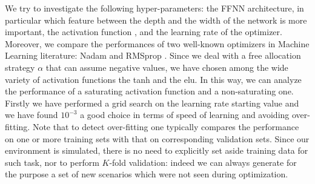 \documentclass[runningheads]{m2ef}
\newcommand{\change}[1]{{\color{red} {#1}}}%
\begin{document}
	We try to investigate the following hyper-parameters: the FFNN architecture, in particular which feature between the depth and the width of the network is more important, the activation function\change{,} and the learning rate of the optimizer. Moreover, we compare the performances of two well-known optimizers in Machine Learning literature: Nadam \cite{Dozat2016} and RMSprop \cite{Hiton2012}. Since we deal with a free allocation strategy $\alpha$ that can assume negative values, we have chosen among the wide variety of activation functions \change{\cite{Goodfellow2016}} the tanh and the elu. In this way, we can analyze the performance of a saturating activation function and a non-saturating one. Firstly we have performed a grid search on the learning rate starting value and we have found $10^{-3}$ a good choice in terms of speed of learning and avoiding over-fitting. \change{Note that to detect over-fitting one typically compares the performance on one or more training sets with that on corresponding validation sets. Since our environment is simulated, there is no need to explicitly set aside training data for such task, nor to perform $K$-fold validation: indeed we can always generate for the purpose a set of new scenarios which were not seen during optimization.}
\end{document}
